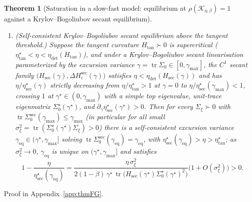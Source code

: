 \documentclass[11pt]{article}
\newtheorem{theorem}{Theorem}
\theoremstyle{remark}
\newcommand{\tr}{\operatorname{tr}}
\begin{document}
\begin{theorem}[Saturation in a slow-fast model: equilibrium at $\rho(\mathcal K_{\eta,\beta})=1$ against a Krylov--Bogoliubov secant equilibrium]
\begin{enumerate}
\item \emph{(Self-consistent Krylov--Bogoliubov secant equilibrium above the tangent threshold.)} Suppose the tangent curvature $H_{\mathrm{tan}}\succ0$ is supercritical ($\eta^\star_{\mathrm{tan}}<\eta<\eta_{\mathrm{det}}(H_{\mathrm{tan}})$), and under a Krylov--Bogoliubov secant linearisation \citep{krylov1947} parameterized by the excursion variance $\gamma=\tr\Sigma_0\in[0,\gamma_{\max}]$, the $C^1$ secant family $\big(H_{\mathrm{sec}}(\gamma),\Delta H_i^{\mathrm{sec}}(\gamma)\big)$ satisfies $\eta<\eta_{\mathrm{det}}(H_{\mathrm{sec}}(\gamma))$ and has $\eta/\eta^\star_{\mathrm{sec}}(\gamma)$ strictly decreasing from $\eta/\eta^\star_{\mathrm{tan}}>1$ at $\gamma=0$ to $\eta/\eta^\star_{\mathrm{sec}}(\gamma_{\max})<1$, crossing $1$ at $\gamma^\star\in(0,\gamma_{\max})$ with a simple top eigenvalue, unit-trace eigenmatrix $\Sigma_0^\star(\gamma^\star)$, and $\partial_\gamma\eta^\star_{\mathrm{sec}}(\gamma^\star)>0$. Then for every $\Sigma_\xi\succ0$ with $\tr\Sigma_0^{\mathrm{sec}}(\gamma_{\max})\le\gamma_{\max}$ (in particular for all small $\sigma_\xi^2=\tr(\Sigma_0^\star(\gamma^\star)\Sigma_\xi)>0$) there is a self-consistent excursion variance $\gamma_{\mathrm{eq}}\in(\gamma^\star,\gamma_{\max}]$ solving $\tr\Sigma_0^{\mathrm{sec}}(\gamma_{\mathrm{eq}})=\gamma_{\mathrm{eq}}$, with $\eta^\star_{\mathrm{sec}}(\gamma_{\mathrm{eq}})>\eta>\eta^\star_{\mathrm{tan}}$; as $\sigma_\xi^2\to0$, $\gamma_{\mathrm{eq}}$ is unique on $(\gamma^\star,\gamma_{\max}]$ and satisfies
\begin{equation}\label{eq:secant-escape-law}
1-\frac{\eta}{\eta^\star_{\mathrm{sec}}(\gamma_{\mathrm{eq}})}=\frac{\eta\,\sigma_\xi^2}{2(1-\beta)\,\gamma^\star\,\tr\big(H_{\mathrm{sec}}(\gamma^\star)\Sigma_0^\star(\gamma^\star)^2\big)}\big(1+O(\sigma_\xi^2)\big)>0.
\end{equation}
\end{enumerate}
\end{theorem}
Proof in Appendix~\ref{app:thmFG}.
\end{document}
